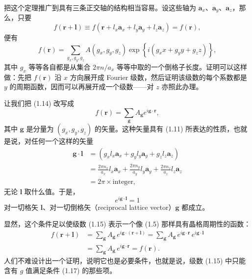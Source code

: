 把这个定理推广到具有三条正交轴的结构相当容易。设这些轴为 $\mathbf{a}_x$、$\mathbf{a}_y$、$\mathbf{a}_z$，那么，只要
\begin{equation*}
f(\mathbf{r}+\boldsymbol{l}) \equiv f(\mathbf{r}+l_x\mathbf{a}_x+l_y\mathbf{a}_y+l_z\mathbf{a}_z) = f(\mathbf{r}),
\tag{1.13}
\end{equation*}
便有
\begin{equation*}
f(\mathbf{r}) = \sum_{g_x,g_y,g_z} A(g_x,g_y,g_z) \exp\left\{ i(g_x x + g_y y + g_z z)\right\},
\tag{1.14}
\end{equation*}
其中 $g_x$ 等等各自都是从集合 $2\pi n/a_x$ 等等中取的一个倒格子长度。证明可以这样做：先把 $f(\mathbf{r})$ 沿 $x$ 方向展开成 Fourier 级数，然后证明该级数的每个系数都是 $y$ 的周期函数，因而可以再展开成一个级数——对 $z$ 亦照此办理。

让我们把 (1.14) 改写成
\begin{equation*}
f(\mathbf{r}) = \sum_{\boldsymbol{g}} A_{\boldsymbol{g}} e^{i\boldsymbol{g}\cdot\mathbf{r}},
\tag{1.15}
\end{equation*}
其中 $\boldsymbol{g}$ 是分量为 $(g_x,g_y,g_z)$ 的矢量。这种矢量具有 (1.11) 所表达的性质，也就是说，对任何一个这样的矢量
\begin{align*}
\boldsymbol{g}\cdot\boldsymbol{l} &= \left(g_x l_x \mathbf{a}_x + g_y l_y \mathbf{a}_y + g_z l_z \mathbf{a}_z\right) \\
&= \frac{2\pi n_x}{a_x} l_x \mathbf{a}_x + \frac{2\pi n_y}{a_y} l_y \mathbf{a}_y + \frac{2\pi n_z}{a_z} l_z \mathbf{a}_z \\
&= 2\pi \times \text{integer},
\tag{1.16}
\end{align*}
无论 $\boldsymbol{l}$ 取什么值。于是，
\begin{equation*}
e^{i\boldsymbol{g}\cdot\boldsymbol{l}} = 1
\tag{1.17}
\end{equation*}
对一切格矢 $\boldsymbol{l}$、对一切倒格矢（reciprocal lattice vector）$\boldsymbol{g}$ 都成立。

显然，这个条件足以使级数 (1.15) 表示一个像 (1.5) 那样具有晶格周期性的函数：
\begin{align*}
f(\mathbf{r}+\boldsymbol{l}) &= \sum_{\boldsymbol{g}} A_{\boldsymbol{g}}\, e^{i\boldsymbol{g}\cdot(\mathbf{r}+\boldsymbol{l})} = \sum_{\boldsymbol{g}} A_{\boldsymbol{g}}\, e^{i\boldsymbol{g}\cdot\mathbf{r}}\, e^{i\boldsymbol{g}\cdot\boldsymbol{l}} \\
&= \sum_{\boldsymbol{g}} A_{\boldsymbol{g}}\, e^{i\boldsymbol{g}\cdot\mathbf{r}} = f(\mathbf{r}).
\tag{1.18}
\end{align*}
人们不难设计出一个证明，说明它也是必要条件，也就是说，级数 (1.15) 中只能含有 $g$ 值满足条件 (1.17) 的那些项。

